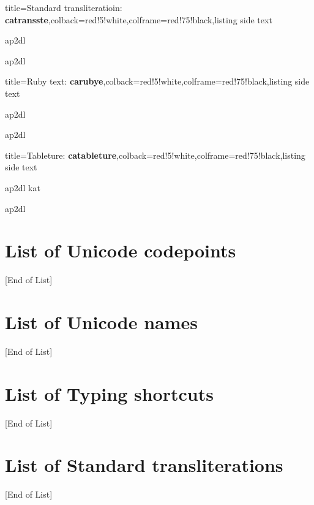 \documentclass{article}
\newcommand\eolist{{\tiny [End of List]}\par}
\begin{document}
\bigskip
\begin{tcblisting}{title={{\sffamily Standard transliteratioin: \bfseries\textcolor{blue!10}{catransste}}},colback=red!5!white,colframe=red!75!black,listing side text}
\begin{catransste}
ap2dl

ap2dl
\end{catransste}
\end{tcblisting}

\bigskip
\begin{tcblisting}{title={{\sffamily Ruby text: \bfseries\textcolor{blue!10}{carubye}}},colback=red!5!white,colframe=red!75!black,listing side text}
\begin{carubye}
ap2dl

ap2dl  


\end{carubye}
\end{tcblisting}

\bigskip
\begin{tcblisting}{title={{\sffamily Tableture: \bfseries\textcolor{blue!10}{catableture}}},colback=red!5!white,colframe=red!75!black,listing side text}
\begin{catableture}
ap2dl kat

ap2dl
\end{catableture}
\end{tcblisting}



\section{List of Unicode codepoints}\label{sec:listcauc}
\begin{multicols}{4}\noindent
\catag
\cashowplainlistuc
\eolist
\end{multicols}

\section{List of Unicode names}\label{sec:listcaun}
\begin{multicols}{4}\noindent
\catag
\cashowplainlistun
\eolist
\end{multicols}


\section{List of Typing shortcuts}\label{sec:listcats}
\begin{multicols}{4}\noindent
\catag
\cashowplainlistts
\eolist
\end{multicols}

\section{List of Standard transliterations}\label{sec:listcast}
\begin{multicols}{4}\noindent
\catag
\cashowplainlistst
\eolist
\end{multicols}
\end{document}
